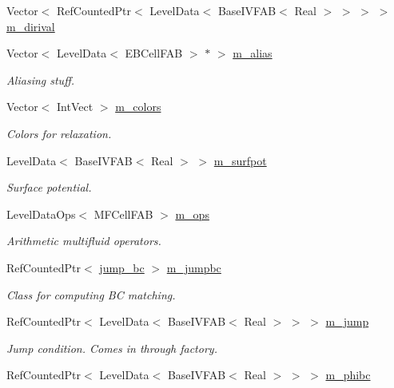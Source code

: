 \begin{DoxyCompactItemize}
Vector$<$ Ref\+Counted\+Ptr$<$ Level\+Data$<$ Base\+I\+V\+F\+AB$<$ Real $>$ $>$ $>$ $>$ \hyperlink{classnwomfconductivityop_a31ec9f563da2ff8d96b8bfb7ed666af6}{m\+\_\+dirival}
\item 
Vector$<$ Level\+Data$<$ E\+B\+Cell\+F\+AB $>$ $\ast$ $>$ \hyperlink{classnwomfconductivityop_a9560594cff54a70feef15260535ed83f}{m\+\_\+alias}
\begin{DoxyCompactList}\small\item\em Aliasing stuff. \end{DoxyCompactList}\item 
Vector$<$ Int\+Vect $>$ \hyperlink{classnwomfconductivityop_a215e6ce66663e176127a862002d2d5ab}{m\+\_\+colors}
\begin{DoxyCompactList}\small\item\em Colors for relaxation. \end{DoxyCompactList}\item 
Level\+Data$<$ Base\+I\+V\+F\+AB$<$ Real $>$ $>$ \hyperlink{classnwomfconductivityop_a6482955f92eebf55beae4895d1d48f30}{m\+\_\+surfpot}
\begin{DoxyCompactList}\small\item\em Surface potential. \end{DoxyCompactList}\item 
Level\+Data\+Ops$<$ M\+F\+Cell\+F\+AB $>$ \hyperlink{classnwomfconductivityop_ae3c702945e77489bf909d10be7f14cb5}{m\+\_\+ops}
\begin{DoxyCompactList}\small\item\em Arithmetic multifluid operators. \end{DoxyCompactList}\item 
Ref\+Counted\+Ptr$<$ \hyperlink{classjump__bc}{jump\+\_\+bc} $>$ \hyperlink{classnwomfconductivityop_a5a38584a144ef9dffa3c8e0c67dd1ca0}{m\+\_\+jumpbc}
\begin{DoxyCompactList}\small\item\em Class for computing BC matching. \end{DoxyCompactList}\item 
Ref\+Counted\+Ptr$<$ Level\+Data$<$ Base\+I\+V\+F\+AB$<$ Real $>$ $>$ $>$ \hyperlink{classnwomfconductivityop_a094701273aec439e9e0965cedbc348a9}{m\+\_\+jump}
\begin{DoxyCompactList}\small\item\em Jump condition. Comes in through factory. \end{DoxyCompactList}\item 
Ref\+Counted\+Ptr$<$ Level\+Data$<$ Base\+I\+V\+F\+AB$<$ Real $>$ $>$ $>$ \hyperlink{classnwomfconductivityop_a48cc4f2bd26e375295184057f3a2bbba}{m\+\_\+phibc}

\end{DoxyCompactItemize}
